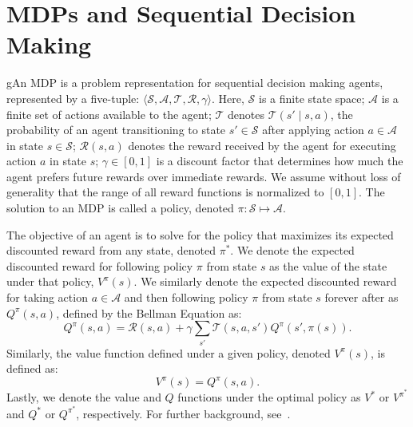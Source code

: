 \section{\acp{MDP} and Sequential Decision Making}



gAn \ac{MDP} is a problem representation for sequential decision making agents, represented by a five-tuple: $\langle \mathcal{S}, \mathcal{A}, \mathcal{T}, \mathcal{R}, \gamma \rangle$. Here, $\mathcal{S}$ is a finite state space; $\mathcal{A}$ is a finite set of actions available to the agent; $\mathcal{T}$ denotes $\mathcal{T}(s' \mid s,a)$, the probability of an agent transitioning to state $s' \in \mathcal{S}$ after applying action $a \in \mathcal{A}$ in state $s \in \mathcal{S}$; $\mathcal{R}(s,a)$ denotes the reward received by the agent for executing action $a$ in state $s$; $\gamma \in [0, 1]$ is a discount factor that determines how much the agent prefers future rewards over immediate rewards. We assume without loss of generality that the range of all reward functions is normalized to $[0,1]$. The solution to an \ac{MDP} is called a policy, denoted $\pi: \mathcal{S} \mapsto \mathcal{A}$.

The objective of an agent is to solve for the policy that maximizes its expected discounted reward from any state, denoted $\pi^*$. We denote the expected discounted reward for following policy $\pi$ from state $s$ as the value of the state under that policy, $V^\pi(s)$. We similarly denote the expected discounted reward for taking action $a \in \mathcal{A}$ and then following policy $\pi$ from state $s$ forever after as $Q^\pi(s,a)$, defined by the Bellman Equation as:
\begin{equation}
Q^\pi(s,a) = \mathcal{R}(s,a) + \gamma \sum_{s'} \mathcal{T}(s,a,s') Q^\pi(s',\pi(s)).
\end{equation}
Similarly, the value function defined under a given policy, denoted $V^\pi(s)$, is defined as:
\begin{equation}
V^\pi(s) = Q^\pi(s,a).
\end{equation}
Lastly, we denote the value and $Q$ functions under the optimal policy as $V^*$ or $V^{\pi^*}$ and $Q^*$ or $Q^{\pi^*}$, respectively. For further background, see~\citet{kaelbling1996reinforcement}.
